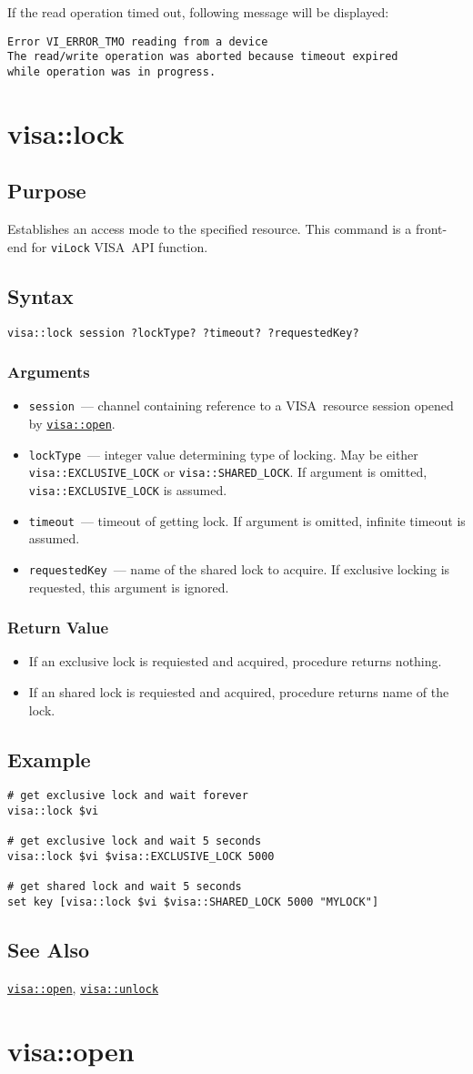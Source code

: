 \documentclass[12pt, a4paper]{report}
\newcommand{\VISA}{\mbox{VISA }}
\newcommand{\COMMANDREF}[1]{{\tt \hyperref[#1]{#1}}}
\newcommand{\VISACOMMANDREF}[1]{{\tt \mbox{#1}}\index{#1}}
\newcommand{\SEEALSO}{\subsection*{See Also}}
\newcommand{\EXAMPLE}{\subsection*{Example}}
\newcommand{\PURPOSE}{\subsection*{Purpose}}
\newcommand{\SYNTAX}[1]{\subsection*{Syntax}{\tt #1}}
\newcommand{\ARGUMENTS}{\subsubsection*{Arguments}}
\newcommand{\RETURN}{\subsubsection*{Return Value}}
\newcommand{\COMMAND}[1]{\section{#1}\label{#1}}
\newcommand{\BEGINARGUMENTS}{\ARGUMENTS\begin{itemize}}
\newcommand{\ENDARGUMENTS}{\end{itemize}}
\newcommand{\ARGUMENT}[1]{\item {\tt \mbox{#1}}~---}
\newcommand{\BACKEND}[1]{This command is a front-end for \VISACOMMANDREF{#1} \VISA API function.}
\newcommand{\ARGCHANNEL}{\ARGUMENT{session} channel containing reference to a \VISA resource session opened by \COMMANDREF{visa::open}.}
\begin{document}
If the read operation timed out, following message will be displayed:

\begin{verbatim} 
Error VI_ERROR_TMO reading from a device
The read/write operation was aborted because timeout expired 
while operation was in progress.
\end{verbatim} 


\COMMAND{visa::lock}

\PURPOSE

Establishes an access mode to the specified resource.
\BACKEND{viLock}

\SYNTAX{visa::lock session ?lockType? ?timeout? ?requestedKey?}

\BEGINARGUMENTS
\ARGCHANNEL
\ARGUMENT{lockType} integer value determining type of locking. May be either {\tt visa::EXCLUSIVE\_LOCK} or {\tt visa::SHARED\_LOCK}. If argument is omitted, {\tt visa::EXCLUSIVE\_LOCK} is assumed.
\ARGUMENT{timeout} timeout of getting lock. If argument is omitted, infinite timeout is assumed.
\ARGUMENT{requestedKey} name of the shared lock to acquire. If exclusive locking is requested, this argument is ignored.
\ENDARGUMENTS

\RETURN

\begin{itemize}
\item If an exclusive lock is requiested and acquired, procedure returns nothing.
\item If an shared lock is requiested and acquired, procedure returns name of the lock.
\end{itemize}

\EXAMPLE

\begin{verbatim} 
# get exclusive lock and wait forever
visa::lock $vi

# get exclusive lock and wait 5 seconds
visa::lock $vi $visa::EXCLUSIVE_LOCK 5000

# get shared lock and wait 5 seconds
set key [visa::lock $vi $visa::SHARED_LOCK 5000 "MYLOCK"]
\end{verbatim} 

\SEEALSO

\COMMANDREF{visa::open}, \COMMANDREF{visa::unlock}


\COMMAND{visa::open}
\end{document}
